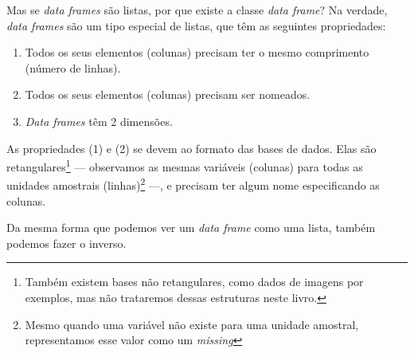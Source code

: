 \documentclass[]{book}
\newenvironment{Shaded}{\begin{snugshade}}{\end{snugshade}}
\newcommand{\CommentTok}[1]{\textcolor[rgb]{0.56,0.35,0.01}{\textit{#1}}}
\newcommand{\DataTypeTok}[1]{\textcolor[rgb]{0.13,0.29,0.53}{#1}}
\newcommand{\DecValTok}[1]{\textcolor[rgb]{0.00,0.00,0.81}{#1}}
\newcommand{\KeywordTok}[1]{\textcolor[rgb]{0.13,0.29,0.53}{\textbf{#1}}}
\newcommand{\NormalTok}[1]{#1}
\newcommand{\OtherTok}[1]{\textcolor[rgb]{0.56,0.35,0.01}{#1}}
\newcommand{\StringTok}[1]{\textcolor[rgb]{0.31,0.60,0.02}{#1}}
\begin{document}
Mas se \emph{data frames} são listas, por que existe a classe \emph{data frame}? Na verdade, \emph{data frames} são um tipo especial de listas, que têm as seguintes propriedades:

\begin{enumerate}
\def\labelenumi{\arabic{enumi}.}
\item
  Todos os seus elementos (colunas) precisam ter o mesmo comprimento (número de linhas).
\item
  Todos os seus elementos (colunas) precisam ser nomeados.
\item
  \emph{Data frames} têm 2 dimensões.
\end{enumerate}

As propriedades (1) e (2) se devem ao formato das bases de dados. Elas são retangulares\footnote{Também existem bases não retangulares, como dados de imagens por exemplos, mas não trataremos dessas estruturas neste livro.} --- observamos as mesmas variáveis (colunas) para todas as unidades amostrais (linhas)\footnote{Mesmo quando uma variável não existe para uma unidade amostral, representamos esse valor como um \emph{missing}} ---, e precisam ter algum nome especificando as colunas.

Da mesma forma que podemos ver um \emph{data frame} como uma lista, também podemos fazer o inverso.

\begin{Shaded}
\end{Shaded}
\end{document}
